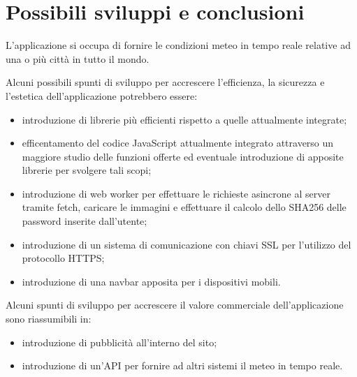 \chapter{Possibili sviluppi e conclusioni}

L'applicazione si occupa di fornire le condizioni meteo in tempo reale relative ad una o più città in tutto il mondo.

\vspace{5mm}

Alcuni possibili spunti di sviluppo per accrescere l'efficienza, la sicurezza e l'estetica dell'applicazione potrebbero essere:
\begin{itemize}
    \item introduzione di librerie più efficienti rispetto a quelle attualmente integrate;
    \item efficentamento del codice JavaScript attualmente integrato attraverso un maggiore studio delle funzioni offerte ed eventuale
          introduzione di apposite librerie per svolgere tali scopi;
    \item introduzione di web worker per effettuare le richieste asincrone al server tramite fetch, caricare le immagini e effettuare
          il calcolo dello SHA256 delle password inserite dall'utente;
    \item introduzione di un sistema di comunicazione con chiavi SSL per l'utilizzo del protocollo HTTPS;
    \item introduzione di una navbar apposita per i dispositivi mobili.
\end{itemize}

\vspace{5mm}

Alcuni spunti di sviluppo per accrescere il valore commerciale dell'applicazione sono riassumibili in:
\begin{itemize}
    \item introduzione di pubblicità all'interno del sito;
    \item introduzione di un'API per fornire ad altri sistemi il meteo in tempo reale.
\end{itemize}